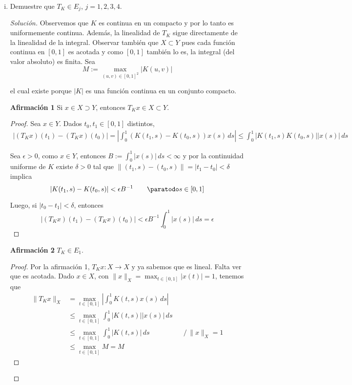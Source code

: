 \documentclass[duedate = 11 de Septiembre, 
			ramo = An\'alisis Funcional, 
			doctype = Tarea 1,
			semester = 2,
			year = 2017]{tarea}
\begin{document}
\begin{enumerate}[(i)]
	\item Demuestre que $T_{K} \in E_{j}$, $j = 1,2,3,4$.
	
	\begin{proof}[Solución] Observemos que $K$ es continua en un compacto y por lo tanto es uniformemente continua. Además, la linealidad de $T_{K}$ sigue directamente de la linealidad de la integral. Observar también que $X \subset Y$ pues cada función continua en $[0,1]$ es acotada y como $[0,1]$ también lo es, la integral (del valor absoluto) es finita. Sea
		$$M := \max_{(u,v) \in [0,1]^{2}} |K(u,v)|$$
	
	el cual existe porque $|K|$ es una función continua en un conjunto compacto.
	
	\textbf{Afirmación 1} Si $x \in X \supset Y$, entonces $T_{K}x \in X \subset Y$.
	
	\begin{proof} Sea $x \in Y$. Dados $t_{0}, t_{1} \in [0,1]$ distintos,
		\begin{align*}
			\left| (T_{K}x)(t_{1}) - (T_{K}x)(t_{0})\right|
				=	\left| \int_{0}^{1} (K(t_{1}, s) - K(t_{0},s))x(s) \, ds \right|
				\leq	\int_{0}^{1} |K(t_{1},s) K(t_{0},s)| |x(s)| \, ds
		\end{align*}
		
	Sea $\epsilon > 0$, como $x \in Y$, entonces $B := \int_{0}^{1} |x(s)| \, ds < \infty$ y por la continuidad uniforme de $K$ existe $\delta > 0$ tal que $\|(t_{1}, s) - (t_{0},s)\| = |t_{1} - t_{0}| < \delta$ implica
		$$|K(t_{1}, s) - K(t_{0}, s)| < \epsilon B^{-1}	\qquad \paratodo s \in [0,1]$$
		
	Luego, si $|t_{0} - t_{1}| < \delta$, entonces
		$$\left| (T_{K}x)(t_{1}) - (T_{K}x)(t_{0})\right| < \epsilon B^{-1} \int_{0}^{1} |x(s)| \, ds = \epsilon$$		
	\end{proof}

	\textbf{Afirmación 2} $T_{K} \in E_{1}$.
		
	\begin{proof} Por la afirmación 1, $T_{K}x :X \to X$ y ya sabemos que es lineal. Falta ver que es acotada. Dado $x \in X$, con $\|x\|_{X} = \max_{t \in [0,1]} |x(t)| = 1$, tenemos que
		\[ \begin{aligned}
			\|T_{K}x\|_{X}
				&=	\max_{t \in [0,1]} \left| \int_{0}^{1} K(t,s)x(s) \, ds \right|	\\
				&\leq	\max_{t \in [0,1]} \int_{0}^{1} |K(t,s)||x(s)| \, ds	\\
				&\leq	\max_{t \in [0,1]} \int_{0}^{1} |K(t,s)| \, ds	&&\big/ \, \|x\|_{X} = 1	\\
				&\leq	\max_{t \in [0,1]} M = M
		\end{aligned} \tag{3.1}\]
		

\end{proof}
\end{proof}
\end{enumerate}
\end{document}
